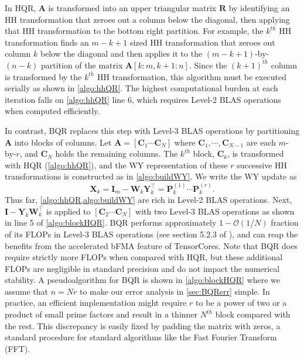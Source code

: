 \documentclass[review,onefignum,onetabnum]{siamart190516}
\newcommand{\bb}[1]{\mathbf{#1}}
\newcommand{\cO}{\mathcal{O}}
\begin{document}
In HQR, $\bb{A}$ is transformed into an upper triangular matrix $\bb{R}$ by identifying an HH transformation that zeroes out a column below the diagonal, then applying that HH transformation to the bottom right partition. 
For example, the $k^{th}$ HH transformation finds an $m-k+1$ sized HH transformation that zeroes out column $k$ below the diagonal and then applies it to the $(m-k+1)$-by-$(n-k)$ partition of the matrix $\bb{A}[k:m,k+1:n]$.
Since the $(k+1)^{th}$ column is transformed by the $k^{th}$ HH transformation, this algorithm must be executed serially as shown in \cref{algo:hhQR}.
The highest computational burden at each iteration falls on \cref{algo:hhQR} line 6, which requires Level-2 BLAS operations when computed efficiently. \par

In contrast, BQR replaces this step with Level-3 BLAS operations by partitioning $\bb{A}$ into blocks of columns.
Let $\bb{A} = [\bb{C}_1 \cdots  \bb{C}_N]$ where $\bb{C}_1,\cdots,\bb{C}_{N-1}$ are each $m$-by-$r$, and $\bb{C}_N$ holds the remaining columns.
The $k^{th}$ block, $\bb{C}_k$, is transformed with HQR (\cref{algo:hhQR}), and the WY representation of these $r$ successive HH transformations is constructed as in \cref{algo:buildWY}.
We write the WY update as
\begin{equation}
	\bb{X}_k = \bb{I}_m -\bb{W}_{k}\bb{Y}_{k}^{\top} = \bb{P}_k^{(1)}\cdots\bb{P}_{k}^{(r)}.
\end{equation}
Thus far, \cref{algo:hhQR,algo:buildWY} are rich in Level-2 BLAS operations.
Next, $\bb{I} -\bb{Y}_{k}\bb{W}_{k}^{\top}$ is applied to $[\bb{C}_2 \cdots  \bb{C}_N]$ with two Level-3 BLAS operations as shown in line 5 of \cref{algo:blockHQR}.
BQR performs approximately $1-\cO(1/N)$ fraction of its FLOPs in Level-3 BLAS operations (see section 5.2.3 of \cite{golub2013matrix}), and can reap the benefits from the accelerated bFMA feature of TensorCores. 
Note that BQR does require strictly more FLOPs when compared with HQR, but these additional FLOPs are negligible in standard precision and do not impact the numerical stability.
A pseudoalgorithm for BQR is shown in \cref{algo:blockHQR} where we assume that $n=Nr$ to make our error analysis in \cref{sec:BQRerr} simple.
In practice, an efficient implementation might require $r$ to be a power of two or a product of small prime factors and result in a thinner $N^{th}$ block compared with the rest. 
This discrepancy is easily fixed by padding the matrix with zeros, a standard procedure for standard algorithms like the Fast Fourier Transform (FFT).
\end{document}
